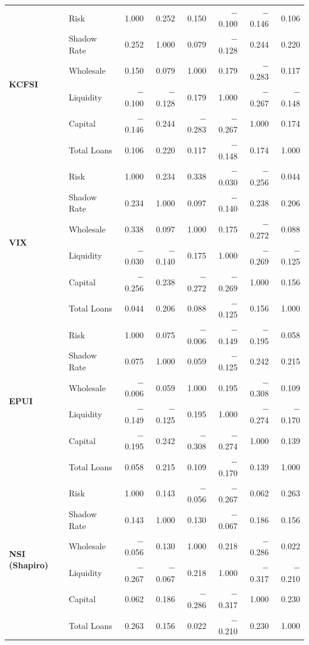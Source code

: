 \documentclass[12pt,a4paper]{report}\usepackage[a4paper, top=2.5cm, bottom=2.5cm, left=2.5cm, right=2.5cm]{geometry}
\begin{document}
\begin{table}[H]
{\begin{tabular}{ll rrrrrr}
\multirow{6}{*}{\textbf{KCFSI}}
 & Risk          &  1.000 &  0.252 &  0.150 & $-$0.100 & $-$0.146 &  0.106 \\
 & Shadow Rate   &  0.252 &  1.000 &  0.079 & $-$0.128 &  0.244 &  0.220 \\
 & Wholesale     &  0.150 &  0.079 &  1.000 &  0.179 & $-$0.283 &  0.117 \\
 & Liquidity     & $-$0.100 & $-$0.128 &  0.179 &  1.000 & $-$0.267 & $-$0.148 \\
 & Capital       & $-$0.146 &  0.244 & $-$0.283 & $-$0.267 &  1.000 &  0.174 \\
 & Total Loans   &  0.106 &  0.220 &  0.117 & $-$0.148 &  0.174 &  1.000 \\
\midrule

\multirow{6}{*}{\textbf{VIX}}
 & Risk          &  1.000 &  0.234 &  0.338 & $-$0.030 & $-$0.256 &  0.044 \\
 & Shadow Rate   &  0.234 &  1.000 &  0.097 & $-$0.140 &  0.238 &  0.206 \\
 & Wholesale     &  0.338 &  0.097 &  1.000 &  0.175 & $-$0.272 &  0.088 \\
 & Liquidity     & $-$0.030 & $-$0.140 &  0.175 &  1.000 & $-$0.269 & $-$0.125 \\
 & Capital       & $-$0.256 &  0.238 & $-$0.272 & $-$0.269 &  1.000 &  0.156 \\
 & Total Loans   &  0.044 &  0.206 &  0.088 & $-$0.125 &  0.156 &  1.000 \\
\midrule

\multirow{6}{*}{\textbf{EPUI}}
 & Risk          &  1.000 &  0.075 & $-$0.006 & $-$0.149 & $-$0.195 &  0.058 \\
 & Shadow Rate   &  0.075 &  1.000 &  0.059 & $-$0.125 &  0.242 &  0.215 \\
 & Wholesale     & $-$0.006 &  0.059 &  1.000 &  0.195 & $-$0.308 &  0.109 \\
 & Liquidity     & $-$0.149 & $-$0.125 &  0.195 &  1.000 & $-$0.274 & $-$0.170 \\
 & Capital       & $-$0.195 &  0.242 & $-$0.308 & $-$0.274 &  1.000 &  0.139 \\
 & Total Loans   &  0.058 &  0.215 &  0.109 & $-$0.170 &  0.139 &  1.000 \\
\midrule

\multirow{6}{*}{\textbf{NSI (Shapiro)}}
 & Risk          &  1.000 &  0.143 & $-$0.056 & $-$0.267 &  0.062 &  0.263 \\
 & Shadow Rate   &  0.143 &  1.000 &  0.130 & $-$0.067 &  0.186 &  0.156 \\
 & Wholesale     & $-$0.056 &  0.130 &  1.000 &  0.218 & $-$0.286 &  0.022 \\
 & Liquidity     & $-$0.267 & $-$0.067 &  0.218 &  1.000 & $-$0.317 & $-$0.210 \\
 & Capital       &  0.062 &  0.186 & $-$0.286 & $-$0.317 &  1.000 &  0.230 \\
 & Total Loans   &  0.263 &  0.156 &  0.022 & $-$0.210 &  0.230 &  1.000 \\
\midrule


\end{tabular}}
\end{table}
\end{document}
